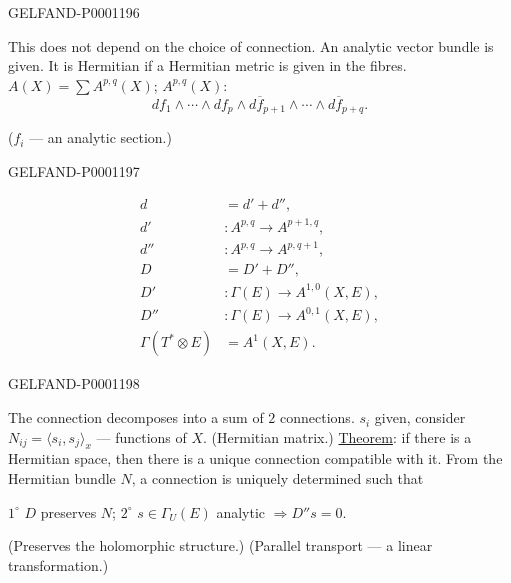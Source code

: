 \begin{GelfandAdjacentEvidence}{GELFAND-P000119}{6}

This does not depend on the choice of connection.
\noindent{}
An analytic vector bundle is given. It is Hermitian if a Hermitian metric is given in the fibres.
$A(X)=\sum A^{p,q}(X)$; $A^{p,q}(X)$:
\begin{equation*}
df_1\wedge\cdots\wedge df_p\wedge d\overline f_{p+1}
\wedge\cdots\wedge d\overline f_{p+q}.
\end{equation*}

($f_i$ — an analytic section.)
\end{GelfandAdjacentEvidence}
\begin{GelfandAdjacentEvidence}{GELFAND-P000119}{7}


\begin{align*}
d&=d'+d'',\\
d'&:A^{p,q}\longrightarrow A^{p+1,q},\\
d''&:A^{p,q}\longrightarrow A^{p,q+1},\\
D&=D'+D'',\\
D'&:\Gamma(E)\longrightarrow A^{1,0}(X,E),\\
D''&:\Gamma(E)\longrightarrow A^{0,1}(X,E),\\
\Gamma(T^*\otimes E)&=A^1(X,E).
\end{align*}
\end{GelfandAdjacentEvidence}
\begin{GelfandAdjacentEvidence}{GELFAND-P000119}{8}

The connection decomposes into a sum of $2$ connections.
$s_i$ given, consider $N_{ij}=\langle s_i,s_j\rangle_x$ — functions of $X$. (Hermitian matrix.)
\underline{Theorem}: if there is a Hermitian space, then there is a unique connection compatible with it.
From the Hermitian bundle $N$, a connection is uniquely determined such that

$1^\circ$ $D$ preserves $N$;
$2^\circ$ $s\in\Gamma_U(E)$ analytic $\Rightarrow D''s=0$.

(Preserves the holomorphic structure.) (Parallel transport — a linear transformation.)
\end{GelfandAdjacentEvidence}
